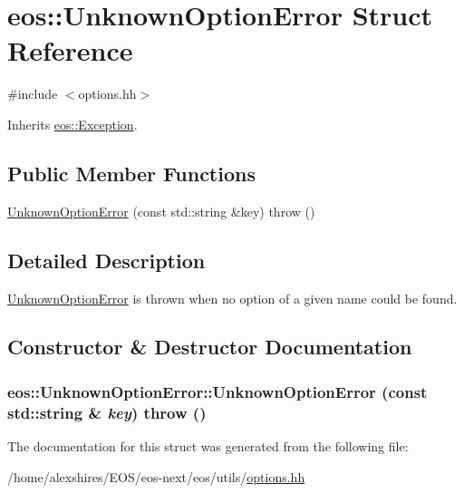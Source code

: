 \hypertarget{structeos_1_1UnknownOptionError}{
\section{eos::UnknownOptionError Struct Reference}
\label{structeos_1_1UnknownOptionError}
}


{\ttfamily \#include $<$options.hh$>$}

Inherits \hyperlink{classeos_1_1Exception}{eos::Exception}.\subsection*{Public Member Functions}
\begin{DoxyCompactItemize}
\item 
\hyperlink{structeos_1_1UnknownOptionError_a9dcdcf2d587d5a07692c4d2688a495ab}{UnknownOptionError} (const std::string \&key)  throw ()
\end{DoxyCompactItemize}


\subsection{Detailed Description}
\hyperlink{structeos_1_1UnknownOptionError}{UnknownOptionError} is thrown when no option of a given name could be found. 

\subsection{Constructor \& Destructor Documentation}
\hypertarget{structeos_1_1UnknownOptionError_a9dcdcf2d587d5a07692c4d2688a495ab}{
\subsubsection[{UnknownOptionError}]{\setlength{\rightskip}{0pt plus 5cm}eos::UnknownOptionError::UnknownOptionError (const std::string \& {\em key})  throw ()}}
\label{structeos_1_1UnknownOptionError_a9dcdcf2d587d5a07692c4d2688a495ab}


The documentation for this struct was generated from the following file:\begin{DoxyCompactItemize}
\item 
/home/alexshires/EOS/eos-\/next/eos/utils/\hyperlink{options_8hh}{options.hh}\end{DoxyCompactItemize}
